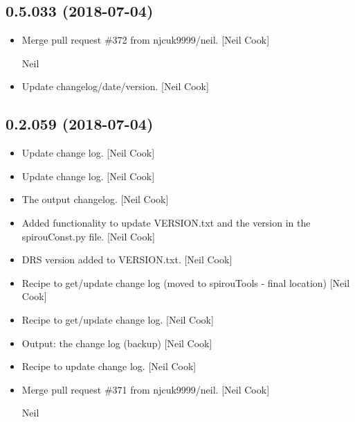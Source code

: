 \documentclass[a4paper,10pt,english]{report}
\begin{document}
\subsection{0.5.033 (2018-07-04)}
\label{\detokenize{misc/changelog:id399}}\begin{itemize}
\item {} 
Merge pull request \#372 from njcuk9999/neil. {[}Neil Cook{]}

Neil

\item {} 
Update changelog/date/version. {[}Neil Cook{]}

\end{itemize}


\subsection{0.2.059 (2018-07-04)}
\label{\detokenize{misc/changelog:id400}}\begin{itemize}
\item {} 
Update change log. {[}Neil Cook{]}

\item {} 
Update change log. {[}Neil Cook{]}

\item {} 
The output changelog. {[}Neil Cook{]}

\item {} 
Added functionality to update VERSION.txt and the version in the
spirouConst.py file. {[}Neil Cook{]}

\item {} 
DRS version added to VERSION.txt. {[}Neil Cook{]}

\item {} 
Recipe to get/update change log (moved to spirouTools - final
location) {[}Neil Cook{]}

\item {} 
Recipe to get/update change log. {[}Neil Cook{]}

\item {} 
Output: the change log (backup) {[}Neil Cook{]}

\item {} 
Recipe to update change log. {[}Neil Cook{]}

\item {} 
Merge pull request \#371 from njcuk9999/neil. {[}Neil Cook{]}

Neil

\end{itemize}
\end{document}
